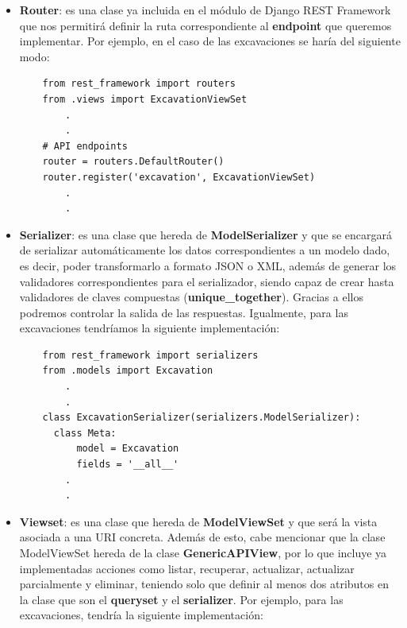     \begin{itemize}
        \item \textbf{Router}: es una clase ya incluida en el módulo de Django REST
        Framework que nos permitirá definir la ruta correspondiente al
        \textbf{endpoint} que queremos implementar. Por ejemplo, en el caso de las
        excavaciones se haría del siguiente modo:
    
    \begin{verbatim}
    from rest_framework import routers
    from .views import ExcavationViewSet
        .
        .
    # API endpoints
    router = routers.DefaultRouter()
    router.register('excavation', ExcavationViewSet)
        .
        .
    \end{verbatim}

        \item \textbf{Serializer}: es una clase que hereda de \textbf{ModelSerializer}
        y que se encargará de serializar automáticamente los datos correspondientes a
        un modelo dado, es decir, poder transformarlo a formato JSON o XML, además
        de generar los validadores correspondientes para el serializador, siendo capaz
        de crear hasta validadores de claves compuestas (\textbf{unique\_together}).
        Gracias a ellos podremos controlar la salida de las respuestas. Igualmente, para
        las excavaciones tendríamos la siguiente implementación:
    
    \begin{verbatim}
    from rest_framework import serializers
    from .models import Excavation
        .
        .
    class ExcavationSerializer(serializers.ModelSerializer):
      class Meta:
          model = Excavation
          fields = '__all__'
        .
        .
    \end{verbatim}

        \item \textbf{Viewset}: es una clase que hereda de \textbf{ModelViewSet} y que
        será la vista asociada a una URI concreta. Además de esto, cabe mencionar que
        la clase ModelViewSet hereda de la clase \textbf{GenericAPIView}, por lo que
        incluye ya implementadas acciones como listar, recuperar, actualizar, actualizar
        parcialmente y eliminar, teniendo solo que definir al menos dos atributos en la
        clase que son el \textbf{queryset} y el \textbf{serializer}. Por ejemplo, para las
        excavaciones, tendría la siguiente implementación:
    

\end{itemize}
